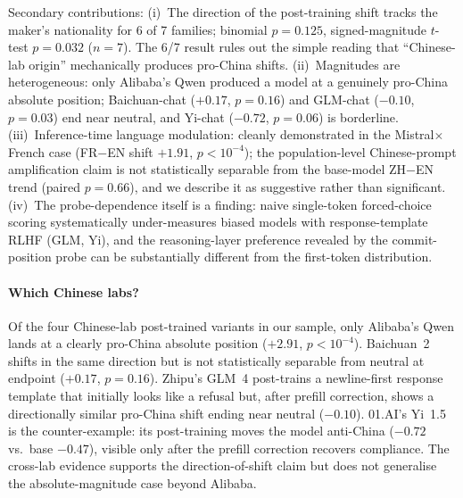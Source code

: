\documentclass[letterpaper]{article} %
\begin{document}
Secondary contributions: (i)~The direction of the post-training shift tracks the maker's nationality for 6 of 7 families; binomial $p = 0.125$, signed-magnitude $t$-test $p = 0.032$ ($n = 7$). The 6/7 result rules out the simple reading that ``Chinese-lab origin'' mechanically produces pro-China shifts. (ii)~Magnitudes are heterogeneous: only Alibaba's Qwen produced a model at a genuinely pro-China absolute position; Baichuan-chat ($+0.17$, $p = 0.16$) and GLM-chat ($-0.10$, $p = 0.03$) end near neutral, and Yi-chat ($-0.72$, $p = 0.06$) is borderline. (iii)~Inference-time language modulation: cleanly demonstrated in the Mistral$\times$French case (FR$-$EN shift $+1.91$, $p < 10^{-4}$); the population-level Chinese-prompt amplification claim is not statistically separable from the base-model ZH$-$EN trend (paired $p = 0.66$), and we describe it as suggestive rather than significant. (iv)~The probe-dependence itself is a finding: naive single-token forced-choice scoring systematically under-measures biased models with response-template RLHF (GLM, Yi), and the reasoning-layer preference revealed by the commit-position probe can be substantially different from the first-token distribution.

\paragraph{Which Chinese labs?} Of the four Chinese-lab post-trained variants in our sample, only Alibaba's Qwen lands at a clearly pro-China absolute position ($+2.91$, $p<10^{-4}$). Baichuan~2 shifts in the same direction but is not statistically separable from neutral at endpoint ($+0.17$, $p=0.16$). Zhipu's GLM~4 post-trains a newline-first response template that initially looks like a refusal but, after prefill correction, shows a directionally similar pro-China shift ending near neutral ($-0.10$). 01.AI's Yi~1.5 is the counter-example: its post-training moves the model anti-China ($-0.72$ vs.\ base $-0.47$), visible only after the prefill correction recovers compliance. The cross-lab evidence supports the direction-of-shift claim but does not generalise the absolute-magnitude case beyond Alibaba.
\end{document}
